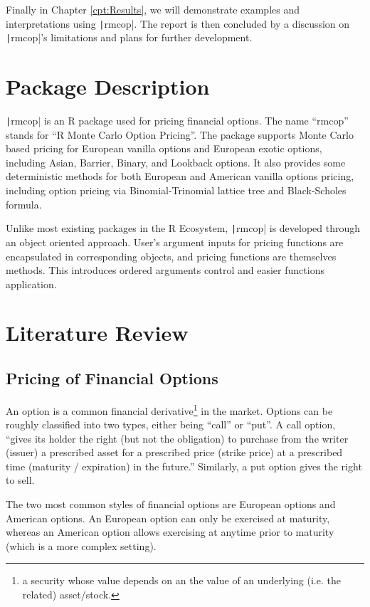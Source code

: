 Finally in Chapter \ref{cpt:Results}, we will demonstrate examples and interpretations using \texttt|rmcop|. The report is then concluded by a discussion on \texttt|rmcop|'s limitations and plans for further development.

\section{Package Description} \label{sec:Pkg Description}

\texttt|rmcop| is an R package used for pricing financial options. The name ``rmcop'' stands for ``R Monte Carlo Option Pricing''. The package supports Monte Carlo based pricing for European vanilla options and European exotic options, including Asian, Barrier, Binary, and Lookback options. It also provides some deterministic methods for both European and American vanilla options pricing, including option pricing via Binomial-Trinomial lattice tree and Black-Scholes formula.

Unlike most existing packages in the R Ecosystem, \texttt|rmcop| is developed through an object oriented approach. User's argument inputs for pricing functions are encapsulated in corresponding objects, and pricing functions are themselves methods. This introduces ordered arguments control and easier functions application.

\section{Literature Review} \label{sec:Literature Review}

\subsection{Pricing of Financial Options}

An option is a common financial derivative\footnote{a security whose value depends on an the value of an underlying (i.e. the related) asset/stock.} in the market. Options can be roughly classified into two types, either being ``call'' or ``put''. A call option, ``gives its holder the right (but not the obligation) to purchase from the writer (issuer) a prescribed asset for a prescribed price (strike price) at a prescribed time (maturity / expiration) in the future.\cite{Higham2004}'' Similarly, a put option gives the right to sell.

The two most common styles of financial options are European options and American options. An European option can only be exercised at maturity, whereas an American option allows exercising at anytime prior to maturity (which is a more complex setting).

